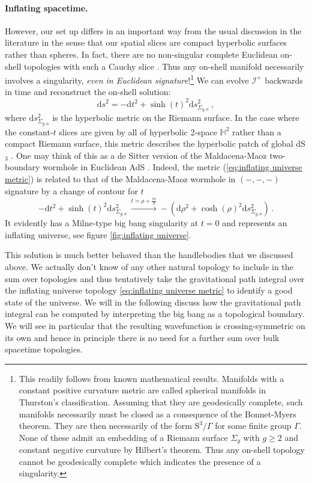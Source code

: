 \documentclass[12pt,a4paper]{article}
\newcommand{\be}{\begin{equation}}
\newcommand{\ee}{\end{equation}}
\renewcommand\d{\text{d}}
\renewcommand{\ge}{\geqslant}
\begin{document}
\paragraph{Inflating spacetime.} However, our set up differs in an important way from the usual discussion in the literature in the sense that our spatial slices are compact hyperbolic surfaces rather than spheres. In fact, there are no non-singular complete Euclidean on-shell topologies with such a Cauchy slice \cite{Anninos:2012ft}. Thus any on-shell manifold necessarily involves a singularity, \emph{even in Euclidean signature}!\footnote{This readily follows from known mathematical results. Manifolds with a constant positive curvature metric are called spherical manifolds in Thurston's classification. Assuming that they are geodesically complete, such manifolds necessarily must be closed as a consequence of the Bonnet-Myers theorem. They are then necessarily of the form $\mathrm{S}^3/\Gamma$ for some finite group $\Gamma$. None of these admit an embedding of a Riemann surface $\Sigma_g$ with $g \ge 2$ and constant negative curvature by Hilbert's theorem. Thus any on-shell topology cannot be geodesically complete which indicates the presence of a singularity.} We can evolve $\mathcal{I}^+$ backwards in time and reconstruct the on-shell solution:
\be 
\d s^2=-\d t^2+\sinh(t)^2 \d s_{\Sigma_{g,n}}^2~, \label{eq:inflating universe metric}
\ee
where $\d s_{\Sigma_{g,n}}^2$ is the hyperbolic metric on the Riemann surface. In the case where the constant-$t$ slices are given by all of hyperbolic 2-space $\mathbb{H}^2$ rather than a compact Riemann surface, this metric describes the hyperbolic patch of global dS$_3$ \cite{Strominger:2001pn, Anninos:2012qw, Anninos:2012ft}. One may think of this as a de Sitter version of the Maldacena-Maoz two-boundary wormhole in Euclidean AdS \cite{Maldacena:2004rf}. Indeed, the metric (\ref{eq:inflating universe metric}) is related to that of the Maldacena-Maoz wormhole in $(-,-,-)$ signature by a change of contour for $t$
\begin{equation}
    -\d t^2 + \sinh(t)^2\d s^2_{\Sigma_{g,n}} \, \stackrel{t = \rho+\tfrac{\pi i}{2}}{\longrightarrow} -\left(\d \rho^2 + \cosh(\rho)^2 \d s^2_{\Sigma_{g,n}}\right)\, .
\end{equation}
It evidently has a Milne-type big bang singularity at $t=0$ and represents an inflating universe, see figure \ref{fig:inflating universe}.

This solution is much better behaved than the handlebodies that we discussed above. We actually don't know of any other natural topology to include in the sum over topologies and thus tentatively take the gravitational path integral over the inflating universe topology \eqref{eq:inflating universe metric} to identify a good state of the universe. We will in the following discuss how the gravitational path integral can be computed by interpreting the big bang as a topological boundary. We will see in particular that the resulting wavefunction is crossing-symmetric on its own and hence in principle there is no need for a further sum over bulk spacetime topologies. 
\end{document}
